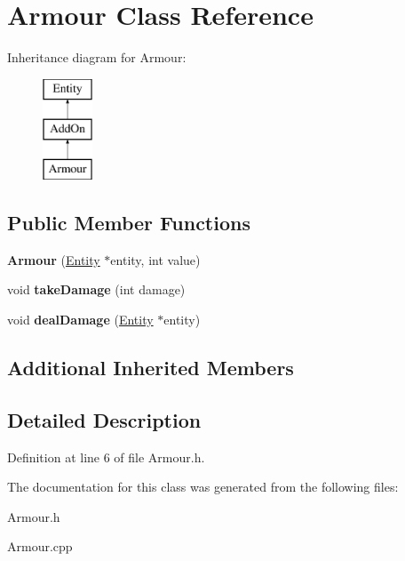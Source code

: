 \hypertarget{classArmour}{}\section{Armour Class Reference}
\label{classArmour}
Inheritance diagram for Armour\+:\begin{figure}[H]
\begin{center}
\leavevmode
\includegraphics[height=3.000000cm]{classArmour}
\end{center}
\end{figure}
\subsection*{Public Member Functions}
\begin{DoxyCompactItemize}
\item 
\mbox{\label{classArmour_a795c5149e3e502530926aff4a6ade971}} 
{\bfseries Armour} (\hyperlink{classEntity}{Entity} $\ast$entity, int value)
\item 
\mbox{\label{classArmour_a7a52bd8473173c81a4ba8a6373513581}} 
void {\bfseries take\+Damage} (int damage)
\item 
\mbox{\label{classArmour_acce6c768aaebaa559ac063e9d67c53b5}} 
void {\bfseries deal\+Damage} (\hyperlink{classEntity}{Entity} $\ast$entity)
\end{DoxyCompactItemize}
\subsection*{Additional Inherited Members}


\subsection{Detailed Description}


Definition at line 6 of file Armour.\+h.



The documentation for this class was generated from the following files\+:\begin{DoxyCompactItemize}
\item 
Armour.\+h\item 
Armour.\+cpp\end{DoxyCompactItemize}
